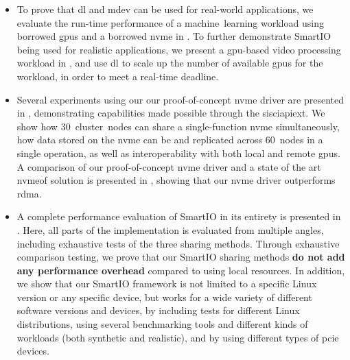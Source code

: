 \begin{itemize}
    \item To prove that \gls{dl} and \gls{mdev} can be used for real-world applications, we evaluate the run-time performance of a machine~learning workload using borrowed \glspl{gpu} and a borrowed \gls{nvme} in .
        To further demonstrate SmartIO being used for realistic applications, we present a \gls{gpu}-based video processing workload in , and use \gls{dl} to scale up the number of available \glspl{gpu} for the workload, in order to meet a real-time deadline.

    \item Several experiments using our our proof-of-concept \gls{nvme} driver are presented in , demonstrating capabilities made possible through the \gls{sisciapiext}.
        We show how 30~cluster~nodes can share a single-function \gls{nvme} simultaneously, how data stored on the \gls{nvme} can be  and replicated across 60~nodes in a single operation, as well as interoperability with both local and remote \glspl{gpu}.
        A comparison of our proof-of-concept \gls{nvme} driver and a state of the art \gls{nvmeof} solution is presented in , showing that our \gls{nvme} driver outperforms \gls{rdma}.


    \item A complete performance evaluation of SmartIO in its entirety is presented in . 
        Here, all parts of the implementation is evaluated from multiple angles, including exhaustive tests of the three sharing methods.
        Through exhaustive comparison testing, we prove that our SmartIO sharing methods \textbf{do not add any performance overhead} compared to using local resources.
        In addition, we show that our SmartIO framework is not limited to a specific Linux version or any specific device, but works for a wide variety of different software versions and devices, by including tests for different Linux distributions, using several benchmarking tools and different kinds of workloads (both synthetic and realistic), and by using different types of \gls{pcie} devices.

\end{itemize}



